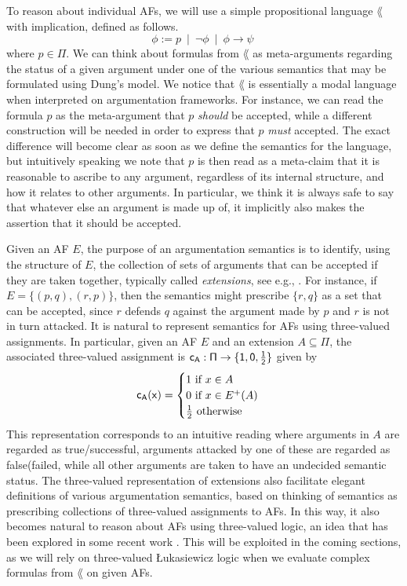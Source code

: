 \documentclass[greybox]{svmult}
\newcommand{\outa}[2]{#1^+(#2)}
\newcommand{\clab}{\sf c}
\begin{document}
To reason about individual AFs, we will use a simple propositional language $\lang$ with implication, defined as follows.
$$
\phi := p \ \mid \ \neg \phi \ \mid \ \phi \to \psi \
$$
where $p \in \Pi$. We can think about formulas from $\lang$ as meta-arguments regarding the status of a given argument under one of the various semantics that may be formulated using Dung's model. We notice that $\lang$ is essentially a modal language when interpreted on argumentation frameworks. For instance, we can read the formula $p$ as the meta-argument that $p$ \emph{should} be accepted, while a different construction will be needed in order to express that $p$ \emph{must} accepted. The exact difference will become clear as soon as we define the semantics for the language, but intuitively speaking we note that $p$ is then read as a meta-claim that it is reasonable to ascribe to any argument, regardless of its internal structure, and how it relates to other arguments. In particular, we think it is always safe to say that whatever else an argument is made up of, it implicitly also makes the assertion that it should be accepted.

Given an AF $E$, the purpose of an argumentation semantics is to identify, using the structure of $E$, the 
collection of sets of arguments that can be accepted if they are taken together, typically called \emph{extensions}, see e.g., \cite{wu}. For instance, if $E = \{(p,q),(r,p)\}$, then the semantics might prescribe $\{r,q\}$ as a set that can be accepted, since $r$ defends $q$ against the argument made by $p$ and $r$ is not in turn attacked. It is natural to represent semantics for AFs using three-valued assignments. In particular, given an AF $E$ and an extension $A \subseteq \Pi$, the associated three-valued assignment is $\clab_A:\Pi \to \three$ given by
$$
\clab_A(x) = \begin{cases} 1 \text{ if } x \in A \\ 0 \text{ if } x \in \outa E A \\ \frac{1}{2} \text{ otherwise } \end{cases}
$$
This representation corresponds to an intuitive reading where arguments in $A$ are regarded as true/successful, arguments attacked by one of these are regarded as false(failed, while all other arguments are taken to have an undecided semantic status. The three-valued representation of extensions also facilitate elegant definitions of various argumentation semantics, based on thinking of semantics as prescribing collections of three-valued assignments to AFs. In this way, it also becomes natural to reason about AFs using three-valued logic, an idea that has been explored in some recent work \cite{dyrkolbotn,arieli,dyrkolbotn1}. This will be exploited in the coming sections, as we will rely on three-valued {\L}ukasiewicz logic when we evaluate complex formulas from $\lang$ on given AFs.
\end{document}
